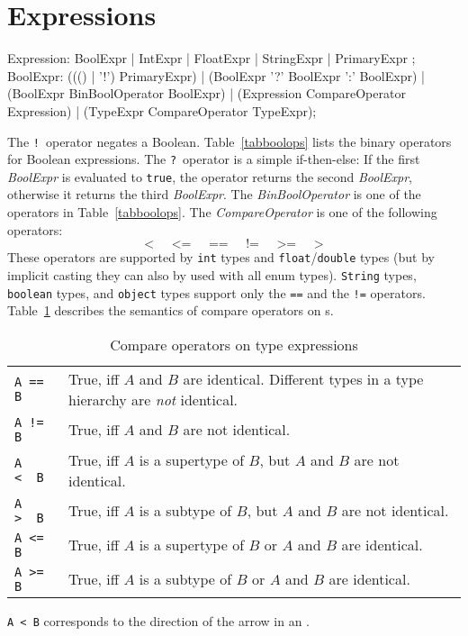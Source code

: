 \section{Expressions}
\label{expressions}
\begin{rail}
  Expression: BoolExpr | IntExpr | FloatExpr | StringExpr | PrimaryExpr ;  
  BoolExpr: ((() | '!') PrimaryExpr) | (BoolExpr '?' BoolExpr ':' BoolExpr) | (BoolExpr BinBoolOperator BoolExpr) | (Expression CompareOperator Expression) | (TypeExpr CompareOperator TypeExpr);
\end{rail}
The \texttt{!}\ operator negates a Boolean. 
Table~\ref{tabboolops} lists the binary operators for Boolean expressions. 
The \texttt{?}\ operator is a simple if-then-else: If the first \emph{BoolExpr} is evaluated to \texttt{true}, the operator returns the second \emph{BoolExpr}, otherwise it returns the third \emph{BoolExpr}.
The \emph{BinBoolOperator} is one of the operators in Table~\ref{tabboolops}.
The \emph{CompareOperator} is one of the following operators:
\[ \texttt{<} \;\;\;\;\; \texttt{<=} \;\;\;\;\; \texttt{==} \;\;\;\;\; \texttt{!=} \;\;\;\;\; \texttt{>=} \;\;\;\;\; \texttt{>} \]
These operators are supported by \texttt{int} types and \texttt{float}/\texttt{double} types (but by implicit casting they can also by used with all enum types).
\texttt{String} types, \texttt{boolean} types, and \texttt{object} types support only the \texttt{==} and the \texttt{!=} operators.
Table~\ref{compandtypes} describes the semantics of compare operators on s.
\begin{table}[htbp]
  \centering
  \begin{tabularx}{\linewidth}{|l|X|} \hline
    \texttt{A == B} & True, iff $A$ and $B$ are identical. Different types in a type hierarchy are \emph{not} identical. \\
    \texttt{A != B} & True, iff $A$ and $B$ are not identical. \\
    \texttt{A <\ \ B} & True, iff $A$ is a supertype of $B$, but $A$ and $B$ are not identical. \\
    \texttt{A >\ \ B} & True, iff $A$ is a subtype of $B$, but $A$ and $B$ are not identical. \\
    \texttt{A <= B} & True, iff $A$ is a supertype of $B$ or $A$ and $B$ are identical. \\
    \texttt{A >= B} & True, iff $A$ is a subtype of $B$ or $A$ and $B$ are identical. \\ \hline
  \end{tabularx}
  \caption{Compare operators on type expressions}
  \label{compandtypes}
\end{table}
\begin{note}
  \texttt{A < B} corresponds to the direction of the arrow in an .
\end{note}


